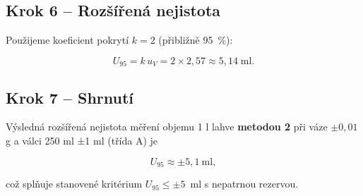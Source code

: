 \subsection{Krok 6 – Rozšířená nejistota}

Použijeme koeficient pokrytí $k=2$ (přibližně 95~\%):

\[
U_{95} = k\,u_V = 2 \times 2{,}57 \approx 5{,}14\;\text{ml}.
\]

\subsection{Krok 7 – Shrnutí}

Výsledná rozšířená nejistota měření objemu 1 l lahve \textbf{metodou 2}  
při váze $\pm0{,}01$ g a válci 250 ml ±1 ml (třída A) je

\[
\boxed{U_{95} \approx \pm 5{,}1\ \text{ml}},
\]

což splňuje stanovené kritérium \mbox{$U_{95}\le \pm 5$ ml} s nepatrnou rezervou.








